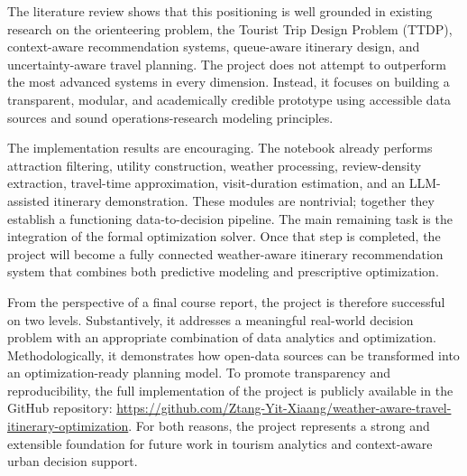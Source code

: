 \documentclass[12pt,a4paper]{article}
\begin{document}
The literature review shows that this positioning is well grounded in existing research on the orienteering problem, the Tourist Trip Design Problem (TTDP), context-aware recommendation systems, queue-aware itinerary design, and uncertainty-aware travel planning. The project does not attempt to outperform the most advanced systems in every dimension. Instead, it focuses on building a transparent, modular, and academically credible prototype using accessible data sources and sound operations-research modeling principles.

The implementation results are encouraging. The notebook already performs attraction filtering, utility construction, weather processing, review-density extraction, travel-time approximation, visit-duration estimation, and an LLM-assisted itinerary demonstration. These modules are nontrivial; together they establish a functioning data-to-decision pipeline. The main remaining task is the integration of the formal optimization solver. Once that step is completed, the project will become a fully connected weather-aware itinerary recommendation system that combines both predictive modeling and prescriptive optimization.

From the perspective of a final course report, the project is therefore successful on two levels. Substantively, it addresses a meaningful real-world decision problem with an appropriate combination of data analytics and optimization. Methodologically, it demonstrates how open-data sources can be transformed into an optimization-ready planning model. To promote transparency and reproducibility, the full implementation of the project is publicly available in the GitHub repository: \url{https://github.com/Ztang-Yit-Xiaang/weather-aware-travel-itinerary-optimization}. For both reasons, the project represents a strong and extensible foundation for future work in tourism analytics and context-aware urban decision support.


% 




\end{document}
